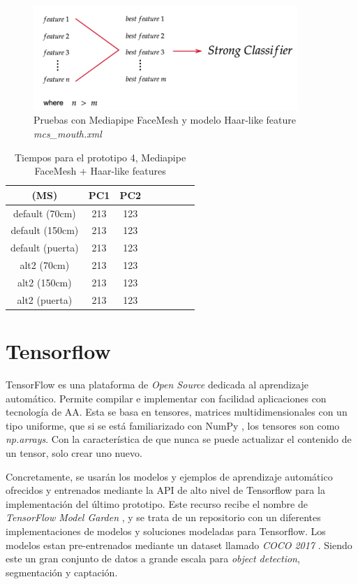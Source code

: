\begin{figure}[htp]
	\centering
	\includegraphics[width=10cm]{imagenes/ada1.png}
	\caption{Pruebas con Mediapipe FaceMesh y modelo Haar-like feature \textit{mcs\_mouth.xml}}
	\label{fig:protoMediapipe}
\end{figure}

\begin{table}[h!]
	\begin{center}
		\begin{tabular}{ |c|c|c|c|c|c|c|c| } 
			\hline
			(MS) & PC1 & PC2 \\
			\hline
			default (70cm) & 213  & 123  \\
			\hline
			default (150cm) & 213  & 123 \\
			\hline
			default (puerta) & 213  & 123 \\
			\hline
			alt2 (70cm) & 213  & 123  \\
			\hline
			alt2 (150cm) & 213  & 123 \\
			\hline
			alt2 (puerta) & 213  & 123 \\
			\hline
		\end{tabular}
		\caption{Tiempos para el prototipo 4, Mediapipe FaceMesh + Haar-like features}
		\label{tab:table5}
	\end{center}
\end{table}

\newpage
\section{Tensorflow}

TensorFlow es una plataforma de \textit{Open Source} dedicada al aprendizaje automático. Permite compilar e implementar con facilidad aplicaciones con tecnología de AA. Esta se basa en tensores, matrices multidimensionales con un tipo uniforme, que si se está familiarizado con NumPy , los tensores son como \textit{np.arrays}. Con la característica de que nunca se puede actualizar el contenido de un tensor, solo crear uno nuevo. \cite{tensorflow}

Concretamente, se usarán los modelos y ejemplos de aprendizaje automático ofrecidos y entrenados mediante la API de alto nivel de Tensorflow para la implementación del último prototipo. Este recurso recibe el nombre de \textit{TensorFlow Model Garden} \cite{modelGarden}, y se trata de un repositorio con un diferentes implementaciones de modelos y soluciones modeladas para Tensorflow. Los modelos estan pre-entrenados mediante un dataset llamado \textit{COCO 2017} \cite{coco}. Siendo este un gran conjunto de datos a grande escala para \textit{object detection}, segmentación y captación.

